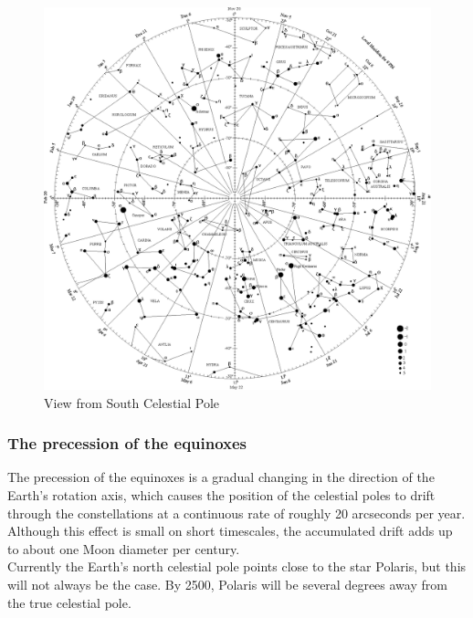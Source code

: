 \documentclass[a4paper,12pt]{extarticle}
\begin{document}
\begin{figure}[H]
    \centering
    \includegraphics[width=0.9 \linewidth]{scp_view.eps}
    \caption{View from South Celestial Pole}
\end{figure}

\subsubsection{The precession of the equinoxes}

The precession of the equinoxes is a gradual changing in the direction of the Earth’s rotation axis, which causes the position of the celestial poles to drift through the constellations at a continuous rate of roughly 20 arcseconds per year. Although this effect is small on short timescales, the accumulated drift adds up to about one Moon diameter per century.\\

Currently the Earth’s north celestial pole points close to the star Polaris, but this will not always be the case. By 2500, Polaris will be several degrees away from the true celestial pole.\\
\end{document}
